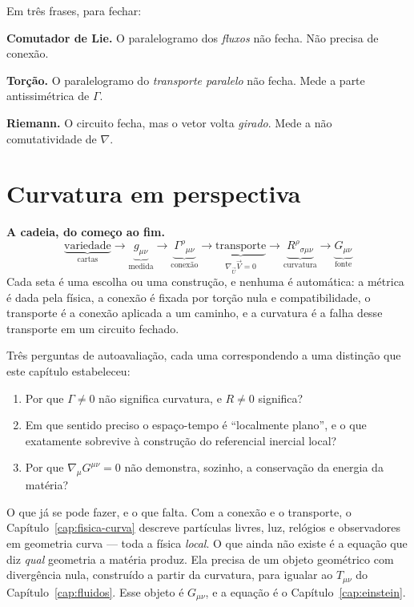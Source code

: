 \documentclass[12pt,a4paper,oneside]{book}
\theoremstyle{rgplain}
\theoremstyle{rgremark}
\begin{document}
Em três frases, para fechar:
\begin{etapas}
  \item \textbf{Comutador de Lie.} O paralelogramo dos \emph{fluxos} não fecha.
  Não precisa de conexão.
  \item \textbf{Torção.} O paralelogramo do \emph{transporte paralelo} não
  fecha. Mede a parte antissimétrica de $\Gamma$.
  \item \textbf{Riemann.} O circuito fecha, mas o vetor volta \emph{girado}.
  Mede a não comutatividade de $\nabla$.
\end{etapas}

\section{Curvatura em perspectiva}
\label{sec:curvatura-perspectiva}

\begin{resultado}
\textbf{A cadeia, do começo ao fim.}
\[
  \underbrace{\text{variedade}}_{\text{cartas}}
  \to \underbrace{g_{\mu\nu}}_{\text{medida}}
  \to \underbrace{\Gamma^\rho{}_{\mu\nu}}_{\text{conexão}}
  \to \underbrace{\text{transporte}}_{\nabla_{\vec U}\vec V=0}
  \to \underbrace{R^\rho{}_{\sigma\mu\nu}}_{\text{curvatura}}
  \to \underbrace{G_{\mu\nu}}_{\text{fonte}}
\]
Cada seta é uma escolha ou uma construção, e nenhuma é automática: a métrica é
dada pela física, a conexão é fixada por torção nula e compatibilidade, o
transporte é a conexão aplicada a um caminho, e a curvatura é a falha desse
transporte em um circuito fechado.
\end{resultado}

Três perguntas de autoavaliação, cada uma correspondendo a uma distinção que
este capítulo estabeleceu:

\begin{enumerate}
  \item Por que $\Gamma\ne0$ não significa curvatura, e $R\ne0$ significa?
  \item Em que sentido preciso o espaço-tempo é ``localmente plano'', e o que
  exatamente sobrevive à construção do referencial inercial local?
  \item Por que $\nabla_\mu G^{\mu\nu}=0$ não demonstra, sozinho, a
  conservação da energia da matéria?
\end{enumerate}

\begin{central}
O que já se pode fazer, e o que falta. Com a conexão e o transporte, o
Capítulo~\ref{cap:fisica-curva} descreve partículas livres, luz, relógios e
observadores em geometria curva --- toda a física \emph{local}. O que ainda
não existe é a equação que diz \emph{qual} geometria a matéria produz. Ela
precisa de um objeto geométrico com divergência nula, construído a partir da
curvatura, para igualar ao $T_{\mu\nu}$ do Capítulo~\ref{cap:fluidos}. Esse
objeto é $G_{\mu\nu}$, e a equação é o Capítulo~\ref{cap:einstein}.
\end{central}
\end{document}
